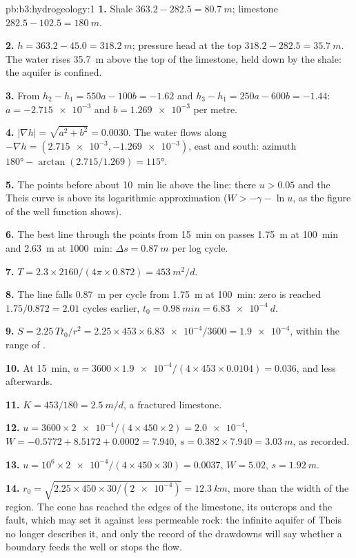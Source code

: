 \begin{solution}{pb:b3:hydrogeology:1}
\textbf{1.} Shale $363.2 - 282.5 = \qty{80.7}{m}$; limestone $282.5 -
102.5 = \qty{180}{m}$.

\textbf{2.} $h = 363.2 - 45.0 = \qty{318.2}{m}$; pressure head at the top
$318.2 - 282.5 = \qty{35.7}{m}$. The water rises \qty{35.7}{m} above the
top of the limestone, held down by the shale: the aquifer is confined.

\textbf{3.} From $h_2 - h_1 = 550a - 100b = -1.62$ and $h_3 - h_1 = 250a
- 600b = -1.44$: $a = \num{-2.715e-3}$ and $b = \num{1.269e-3}$ per
metre.

\textbf{4.} $|\nabla h| = \sqrt{a^2 + b^2} = \num{0.0030}$. The water
flows along $-\nabla h = (\num{2.715e-3}, \num{-1.269e-3})$, east and
south: azimuth $\ang{180} - \arctan(2.715/1.269) = \ang{115}$.

\textbf{5.} The points before about \qty{10}{min} lie above the line: there
$u > 0.05$ and the Theis curve is above its logarithmic approximation
($W > -\gamma - \ln u$, as the figure of the well function shows).

\textbf{6.} The best line through the points from \qty{15}{min} on passes
\qty{1.75}{m} at \qty{100}{min} and \qty{2.63}{m} at \qty{1000}{min}:
$\Delta s = \qty{0.87}{m}$ per log cycle.

\textbf{7.} $T = 2.3\times2160/(4\pi\times0.872) = \qty{453}{m^2/d}$.

\textbf{8.} The line falls \qty{0.87}{m} per cycle from \qty{1.75}{m} at
\qty{100}{min}: zero is reached $1.75/0.872 = 2.01$ cycles earlier,
$t_0 = \qty{0.98}{min} = \qty{6.83e-4}{d}$.

\textbf{9.} $S = 2.25\,Tt_0/r^2 = 2.25\times453\times\num{6.83e-4}/3600 =
\num{1.9e-4}$, within the range of .

\textbf{10.} At \qty{15}{min}, $u = 3600\times\num{1.9e-4}/(4\times453
\times0.0104) = \num{0.036}$, and less afterwards.

\textbf{11.} $K = 453/180 = \qty{2.5}{m/d}$, a fractured limestone.

\textbf{12.} $u = 3600\times\num{2e-4}/(4\times450\times2) =
\num{2.0e-4}$, $W = -0.5772 + 8.5172 + 0.0002 = \num{7.940}$, $s =
0.382\times7.940 = \qty{3.03}{m}$, as recorded.

\textbf{13.} $u = 10^6\times\num{2e-4}/(4\times450\times30) =
\num{0.0037}$, $W = \num{5.02}$, $s = \qty{1.92}{m}$.

\textbf{14.} $r_0 = \sqrt{2.25\times450\times30/(\num{2e-4})} =
\qty{12.3}{km}$, more than the width of the region. The cone has reached
the edges of the limestone, its outcrops and the fault, which may set it
against less permeable rock: the infinite aquifer of Theis no longer
describes it, and only the record of the drawdowns will say whether a
boundary feeds the well or stops the flow.


\end{solution}
